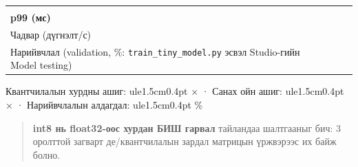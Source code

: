 \begin{longtable}[]{@{}llll@{}}
\begin{minipage}[t]{0.22\columnwidth}
\strut
\end{minipage}\tabularnewline
\begin{minipage}[t]{0.22\columnwidth}\raggedright
\textbf{p99 (мс)}\strut
\end{minipage} & \begin{minipage}[t]{0.22\columnwidth}\raggedright
\strut
\end{minipage} & \begin{minipage}[t]{0.22\columnwidth}\raggedright
\strut
\end{minipage} & \begin{minipage}[t]{0.22\columnwidth}\raggedright
\strut
\end{minipage}\tabularnewline
\begin{minipage}[t]{0.22\columnwidth}\raggedright
Чадвар (дүгнэлт/с)\strut
\end{minipage} & \begin{minipage}[t]{0.22\columnwidth}\raggedright
\strut
\end{minipage} & \begin{minipage}[t]{0.22\columnwidth}\raggedright
\strut
\end{minipage} & \begin{minipage}[t]{0.22\columnwidth}\raggedright
\strut
\end{minipage}\tabularnewline
\begin{minipage}[t]{0.22\columnwidth}\raggedright
Нарийвчлал (validation, \%: \texttt{train\_\allowbreak{}tiny\_\allowbreak{}model.\allowbreak{}py} эсвэл Studio-гийн Model testing)\strut
\end{minipage} & \begin{minipage}[t]{0.22\columnwidth}\raggedright
\strut
\end{minipage} & \begin{minipage}[t]{0.22\columnwidth}\raggedright
\strut
\end{minipage} & \begin{minipage}[t]{0.22\columnwidth}\raggedright
\strut
\end{minipage}\tabularnewline
\bottomrule
\end{longtable}\endgroup

Квантчилалын хурдны ашиг: ule{1.5cm}{0.4pt} × · Санах ойн ашиг: ule{1.5cm}{0.4pt} × · Нарийвчлалын алдагдал: ule{1.5cm}{0.4pt} \%

\begin{quote}
\textbf{int8 нь float32-оос хурдан БИШ гарвал} тайландаа шалтгааныг бич: 3 оролттой загварт де/квантчилалын зардал матрицын үржвэрээс их байж болно.
\end{quote}

